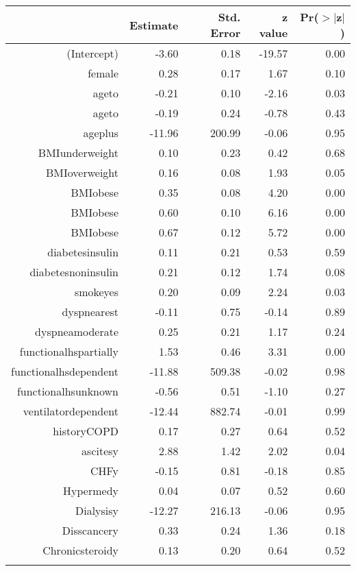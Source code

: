 \bigskip\bigskip
\centering
\begin{tabular}{rrrrr}
  \hline
 & Estimate & Std. Error & z value & Pr($>$$|$z$|$) \\ 
  \hline
(Intercept) & -3.60 & 0.18 & -19.57 & 0.00 \\ 
  female & 0.28 & 0.17 & 1.67 & 0.10 \\ 
  age\-65\-to\-74 & -0.21 & 0.10 & -2.16 & 0.03 \\ 
  age\-75\-to\-84 & -0.19 & 0.24 & -0.78 & 0.43 \\ 
  age\-85\-plus & -11.96 & 200.99 & -0.06 & 0.95 \\ 
  BMI\-underweight & 0.10 & 0.23 & 0.42 & 0.68 \\ 
  BMI\-overweight & 0.16 & 0.08 & 1.93 & 0.05 \\ 
  BMI\-obese\-1 & 0.35 & 0.08 & 4.20 & 0.00 \\ 
  BMI\-obese\-2 & 0.60 & 0.10 & 6.16 & 0.00 \\ 
  BMI\-obese\-3 & 0.67 & 0.12 & 5.72 & 0.00 \\ 
  diabetes\-insulin & 0.11 & 0.21 & 0.53 & 0.59 \\ 
  diabetes\-noninsulin & 0.21 & 0.12 & 1.74 & 0.08 \\ 
  smoke\-yes & 0.20 & 0.09 & 2.24 & 0.03 \\ 
  dyspnea\-rest & -0.11 & 0.75 & -0.14 & 0.89 \\ 
  dyspnea\-moderate & 0.25 & 0.21 & 1.17 & 0.24 \\ 
  functional\-hs\-partially & 1.53 & 0.46 & 3.31 & 0.00 \\ 
  functional\-hs\-dependent & -11.88 & 509.38 & -0.02 & 0.98 \\ 
  functional\-hs\-unknown & -0.56 & 0.51 & -1.10 & 0.27 \\ 
  ventilator\-dependent & -12.44 & 882.74 & -0.01 & 0.99 \\ 
  history\-COPD & 0.17 & 0.27 & 0.64 & 0.52 \\ 
  ascites\-y & 2.88 & 1.42 & 2.02 & 0.04 \\ 
  CHF\-y & -0.15 & 0.81 & -0.18 & 0.85 \\ 
  Hyper\-med\-y & 0.04 & 0.07 & 0.52 & 0.60 \\ 
  Dialysis\-y & -12.27 & 216.13 & -0.06 & 0.95 \\ 
  Diss\-cancer\-y & 0.33 & 0.24 & 1.36 & 0.18 \\ 
  Chronic\-steroid\-y & 0.13 & 0.20 & 0.64 & 0.52 \\ 
$$
\end{tabular}

